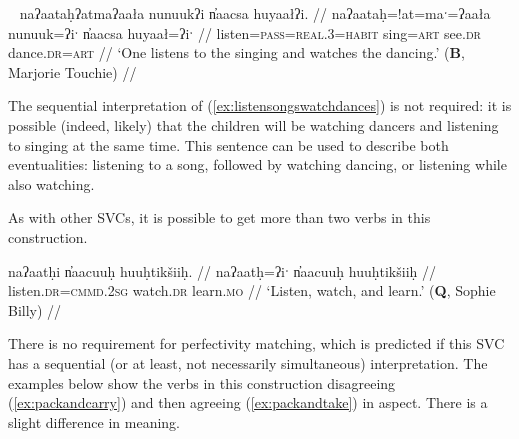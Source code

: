\ex~ \label{ex:listensongswatchdances}
\begingl
\glpreamble naʔaataḥʔatmaʔaała nunuukʔi n̓aacsa huyaałʔi. //
\gla naʔaataḥ=!at=maˑ=ʔaała nunuuk=ʔiˑ n̓aacsa huyaał=ʔiˑ //
\glb listen=\textsc{pass}=\textsc{real.3}=\textsc{habit} sing=\textsc{art} see.\textsc{dr} dance.\textsc{dr}=\textsc{art} //
\glft `One listens to the singing and watches the dancing.' (\textbf{B}, Marjorie Touchie) //
\endgl
\xe

The sequential interpretation of (\ref{ex:listensongswatchdances}) is not required: it is possible (indeed, likely) that the children will be watching dancers and listening to singing at the same time. This sentence can be used to describe both eventualities: listening to a song, followed by watching dancing, or listening while also watching.

\begin{comment}
It is possible for both verbs in this kind of SVC to share a single direct object. [[Comment: Below be recategorized as Type I?]]

TODO recast the below

\ex \label{ex:listenrespect}
\begingl
\glpreamble naʔaataḥʔaqƛ̓iʔaał ʔiisaak ʔuukʷił ʔaʔiič̓um. //
\gla naʔaataḥ=!aqƛ=!iˑ=ʔaał ʔiisaak ʔu-L.(č)ił ʔaʔiič̓um //
\glb listen.\textsc{dr}=\textsc{fut}=\textsc{cmmd.2sg}=\textsc{habit} respect.\textsc{dr} \textsc{x}-do.to elder.\textsc{pl} //
\glft `Listen to and respect the elders.' (\textbf{C}, \textit{tupaat} Julia Lucas) //
\endgl
\xe


\end{comment}

As with other SVCs, it is possible to get more than two verbs in this construction.

\ex \label{ex:listenwtachlearn}
\begingl
\glpreamble naʔaatḥi n̓aacuuḥ huuḥtikšiiḥ. //
\gla naʔaatḥ=ʔiˑ n̓aacuuḥ huuḥtikšiiḥ //
\glb listen.\textsc{dr}=\textsc{cmmd.2sg} watch.\textsc{dr} learn.\textsc{mo} //
\glft `Listen, watch, and learn.' (\textbf{Q}, Sophie Billy) //
\endgl
\xe

There is no requirement for perfectivity matching, which is predicted if this SVC has a sequential (or at least, not necessarily simultaneous) interpretation. The examples below show the verbs in this construction disagreeing (\ref{ex:packandcarry}) and then agreeing (\ref{ex:packandtake}) in aspect. There is a slight difference in meaning.

